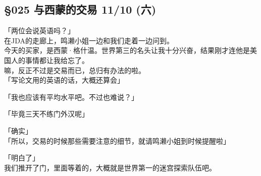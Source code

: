 \subsection{§025 与西蒙的交易 11/10 (六)}

「两位会说英语吗？」\\

在JDA的走廊上，鸣濑小姐一边和我们走着一边问到。\\

今天的买家，是西蒙·格什温。世界第三的名头让我十分兴奋，结果刚才连他是美国人的事情都让我给忘了。\\

嘛，反正不过是交易而已，总归有办法的啦。\\

「写论文用的英语的话，大概还算会」

「我也应该有平均水平吧。不过也难说？」

「毕竟三天不练门外汉呢」

「确实」\\

「所以，交易的时候那些需要注意的细节，就请鸣濑小姐到时候提醒啦」

「明白了」\\

我们推开了门，里面等着的，大概就是世界第一的迷宫探索队伍吧。\\

\\


